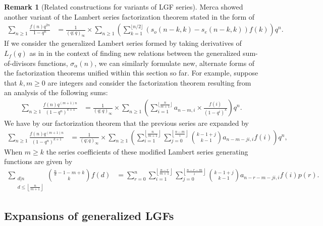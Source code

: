 \documentclass[12pt,reqno,a4letter]{article}
\numberwithin{figure}{section}
\numberwithin{table}{section}
\numberwithin{equation}{section}
\theoremstyle{plain}
\numberwithin{theorem}{section}
\theoremstyle{definition}
\newtheorem{remark}[theorem]{Remark}
\begin{document}
\begin{remark}[Related constructions for variants of LGF series]
Merca showed another variant of the Lambert series factorization theorem 
stated in the form of \cite[Cor.\ 6.1]{MERCA-LSFACTTHM}
\begin{align*} 
\sum_{n \geq 1} \frac{f(n) q^{2n}}{1-q^n} & = \frac{1}{(q; q)_{\infty}} \times 
     \sum_{n \geq 1} \left(\sum_{k=1}^{\lfloor n/2 \rfloor} \left( 
     s_o(n-k, k) - s_e(n-k, k)\right) f(k) \right) q^n. 
\end{align*} 
If we consider the generalized Lambert series formed by taking derivatives of 
$L_f(q)$ as in \cite{MDS-COMBRESTRDIVSUMS-INTEGERS} in the 
context of finding new relations between the generalized sum-of-divisors functions, 
$\sigma_{\alpha}(n)$, we can similarly formulate new, alternate forms of the 
factorization theorems unified within this section so far. 
For example, suppose that $k, m \geq 0$ are integers and 
consider the factorization theorem resulting from an analysis of the following sums: 
\begin{align*}  
\sum_{n \geq 1} \frac{f(n) q^{(m+1)n}}{(1-q^n)^{k+1}} & = \frac{1}{(q; q)_{\infty}} \times 
     \sum_{n \geq 1} \left(\sum_{i=1}^{\lfloor \frac{n}{m+1} \rfloor} a_{n-m, i} \times 
     \frac{f(i)}{(1-q^i)^k} \right) q^n. 
\end{align*} 
We have by our factorization theorem that the previous series 
are expanded by 
\begin{align*}  
\sum_{n \geq 1} \frac{f(n) q^{(m+1)n}}{(1-q^n)^{k+1}} & = \frac{1}{(q; q)_{\infty}} \times 
     \sum_{n \geq 1} \left(\sum_{i=1}^{\left\lfloor \frac{n}{m+1} \right\rfloor} 
     \sum_{j=0}^{\left\lfloor \frac{n-m}{i} \right\rfloor} 
     \binom{k-1+j}{k-1} a_{n-m-ji, i} f(i) \right) q^n, 
\end{align*} 
When $m \geq k$ the series coefficients of these modified Lambert series 
generating functions are given by 
\begin{align*} 
\sum_{\substack{d|n \\ d \leq \left\lfloor \frac{n}{m+1} \right\rfloor}} 
     \scriptstyle{\binom{\frac{n}{d}-1-m+k}{k}} f(d) & = 
     \sum_{r=0}^n \sum_{i=1}^{\left\lfloor \frac{n-r}{m+1} \right\rfloor} 
     \sum_{j=0}^{\left\lfloor \frac{n-r-m}{i} \right\rfloor} 
     \binom{k-1+j}{k-1} a_{n-r-m-ji, i} f(i) p(r). 
\end{align*}
\end{remark}

\subsection{Expansions of generalized LGFs}
\end{document}
